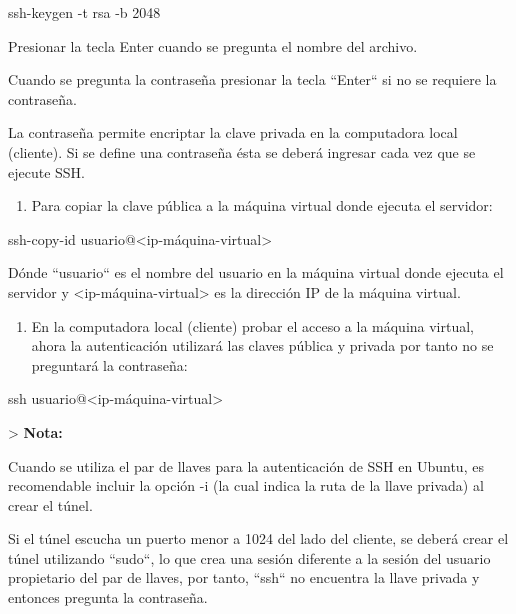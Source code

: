 \begin{SourceCode}
ssh-keygen -t rsa -b 2048
\end{SourceCode}

Presionar la tecla Enter cuando se pregunta el nombre del archivo.

Cuando se pregunta la contraseña presionar la tecla ``Enter`` si no se requiere la contraseña.

La contraseña permite encriptar la clave privada en la computadora local (cliente). Si se define una contraseña ésta se deberá ingresar cada vez que se ejecute SSH.

\begin{enumerate}

\item Para copiar la clave pública a la máquina virtual donde ejecuta el servidor:

\end{enumerate}

\begin{SourceCode}
ssh-copy-id usuario@<ip-máquina-virtual>
\end{SourceCode}

Dónde ``usuario`` es el nombre del usuario en la máquina virtual donde ejecuta el servidor y <ip-máquina-virtual> es la dirección IP de la máquina virtual.

\begin{enumerate}

\item En la computadora local (cliente) probar el acceso a la máquina virtual, ahora la autenticación utilizará las claves pública y privada por tanto no se preguntará la contraseña:

\end{enumerate}

\begin{SourceCode}
ssh usuario@<ip-máquina-virtual>
\end{SourceCode}

> \textbf{Nota:}

Cuando se utiliza el par de llaves para la autenticación de SSH en Ubuntu, es recomendable incluir la opción -i (la cual indica la ruta de la llave privada) al crear el túnel.

Si el túnel escucha un puerto menor a 1024 del lado del cliente, se deberá crear el túnel utilizando ``sudo``, lo que crea una sesión diferente a la sesión del usuario propietario del par de llaves, por tanto, ``ssh`` no encuentra la llave privada y entonces pregunta la contraseña.


